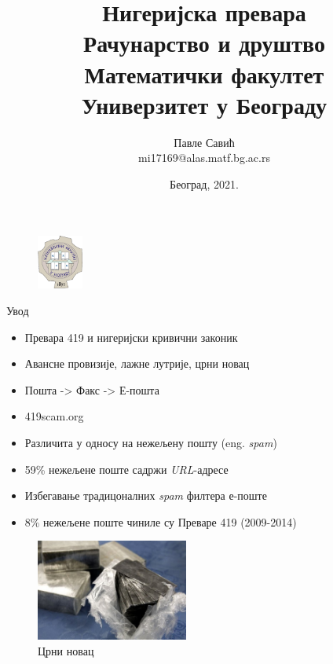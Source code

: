 \documentclass[compress, containsverbatim,mathserif, xcolor=dvipsnames, unicode]{beamer}
\title{Нигеријска превара\\\small{Рачунарство и друштво\\Математички факултет\\Универзитет у Београду}}
\author{Павле Савић\\mi17169@alas.matf.bg.ac.rs}
\date{
 \footnotesize{Београд, 2021.}
}
\begin{document}
\begin{frame}
\titlepage

\begin{figure}[h!]
    \centering
    \begin{flushleft}
    \includegraphics[width=15mm]{slike/matf.png}
    \end{flushleft}
\end{figure}

\end{frame}

\begin{frame}{Увод}

\begin{itemize}		
	\item Превара 419 и нигеријски кривични законик
	\item Авансне провизије, лажне лутрије, црни новац
	\item Пошта -> Факс -> Е-пошта
	\item 419scam.org
	\item Различита у односу на нежељену пошту (eng. \emph{spam})
	\item 59\% нежељене поште садржи \emph{URL}-адресе
	\item Избегавање традицоналних \emph{spam} филтера е-поште
	\item 8\% нежељене поште чиниле су Преваре 419 (2009-2014)
\end{itemize}

\begin{figure}[h!]
    \centering
    \begin{center}
    \includegraphics[width=50mm]{slike/blackmoney.jpg}
    \caption{Црни новац}
    \end{center}
\end{figure}

\end{frame}
\end{document}
